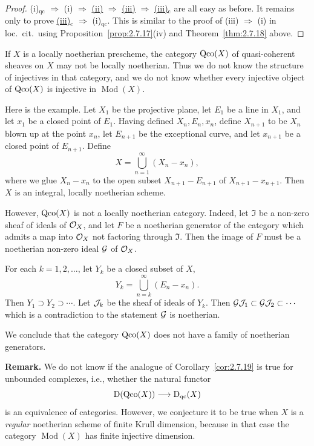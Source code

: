 \begin{proof}
(i)${}_{\mathrm{qc}}$ $\Rightarrow$ (i) $\Rightarrow$ \underline{(ii)} $\Rightarrow$ \underline{(iii)} $\Rightarrow$ \underline{(iii)}${}_{\mathrm{c}}$ are all easy as before. It remains only to prove \underline{(iii)}${}_{\mathrm{c}}$ $\Rightarrow$ (i)${}_{\mathrm{qc}}$. This is similar to the proof of (iii) $\Rightarrow$ (i) in loc.\ cit.\ using Proposition~\ref{prop:2.7.17}(iv) and Theorem~\ref{thm:2.7.18} above.
\end{proof}

\begin{example*}
If $X$ is a locally noetherian prescheme, the category $\operatorname{Qco}(X)$ of quasi-coherent sheaves on $X$ may not be locally noetherian. Thus we do not know the structure of injectives in that category, and we do not know whether every injective object of $\operatorname{Qco}(X)$ is injective in $\operatorname{Mod}(X)$.

Here is the example. Let $X_1$ be the projective plane, let $E_1$ be a line in $X_1$, and let $x_1$ be a closed point of $E_1$. Having defined $X_n, E_n, x_n$, define $X_{n+1}$ to be $X_n$ blown up at the point $x_n$, let $E_{n+1}$ be the exceptional curve, and let $x_{n+1}$ be a closed point of $E_{n+1}$. Define
\[
X = \bigcup_{n=1}^{\infty} (X_n - x_n),
\]
where we glue $X_n-x_n$ to the open subset $X_{n+1}-E_{n+1}$ of $X_{n+1}-x_{n+1}$. Then $X$ is an integral, locally noetherian scheme.

However, $\operatorname{Qco}(X)$ is not a locally noetherian category. Indeed, let $\mathfrak{I}$ be a non-zero sheaf of ideals of $\mathcal{O}_X$, and let $F$ be a noetherian generator of the category which admits a map into $\mathcal{O}_X$ not factoring through $\mathfrak{I}$. Then the image of $F$ must be a noetherian non-zero ideal $\mathcal{G}$ of $\mathcal{O}_X$.

For each $k=1,2,\dots$, let $Y_k$ be a closed subset of $X$,
\[
Y_k = \bigcup_{n=k}^{\infty} (E_n - x_n).
\]
Then $Y_1 \supset Y_2 \supset \cdots$. Let $\mathcal{J}_k$ be the sheaf of ideals of $Y_k$. Then $\mathcal{G}\mathcal{J}_1 \subset \mathcal{G}\mathcal{J}_2 \subset \cdots$ which is a contradiction to the statement $\mathcal{G}$ is noetherian.

We conclude that the category $\operatorname{Qco}(X)$ does not have a family of noetherian generators.
\end{example*}

\textbf{Remark.}
We do not know if the analogue of Corollary~\ref{cor:2.7.19} is true for unbounded complexes, i.e., whether the natural functor
\[
\operatorname{D}(\operatorname{Qco}(X)) \longrightarrow \operatorname{D}_{\mathrm{qc}}(X)
\]
is an equivalence of categories. However, we conjecture it to be true when $X$ is a \emph{regular} noetherian scheme of finite Krull dimension, because in that case the category $\operatorname{Mod}(X)$ has finite injective dimension.

